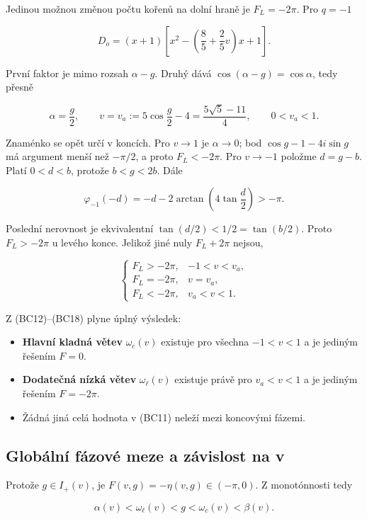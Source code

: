 \documentclass[11pt,a4paper]{article}
\theoremstyle{remark}\newtheorem{remark}[theorem]{Poznámka}
\numberwithin{equation}{section}
\providecommand{\tightlist}{\setlength{\itemsep}{0pt}\setlength{\parskip}{0pt}}
\begin{document}
Jedinou možnou změnou počtu kořenů na dolní hraně je \(F_L=-2\pi\). Pro
\(q=-1\)

\[
D_o=(x+1)\left[x^2-\left(\frac85+\frac25v\right)x+1\right].
\tag{BC16}
\]

První faktor je mimo rozsah \(\alpha-g\). Druhý dává
\(\cos(\alpha-g)=\cos\alpha\), tedy přesně

\[
\alpha=\frac g2,\qquad
v=v_a:=5\cos\frac g2-4=\frac{5\sqrt5-11}{4},
\qquad 0<v_a<1.
\tag{BC17}
\]

Znaménko se opět určí v koncích. Pro \(v\to1\) je \(\alpha\to0\); bod
\(\cos g-1-4i\sin g\) má argument menší než \(-\pi/2\), a proto
\(F_L<-2\pi\). Pro \(v\to-1\) položme \(d=g-b\). Platí \(0<d<b\),
protože \(b<g<2b\). Dále

\[
\varphi_{-1}(-d)
=-d-2\arctan\left(4\tan\frac d2\right)>-\pi.
\]

Poslední nerovnost je ekvivalentní \(\tan(d/2)<1/2=\tan(b/2)\). Proto
\(F_L>-2\pi\) u levého konce. Jelikož jiné nuly \(F_L+2\pi\) nejsou,

\[
\begin{cases}
F_L>-2\pi,& -1<v<v_a,\\
F_L=-2\pi,& v=v_a,\\
F_L<-2\pi,& v_a<v<1.
\end{cases}
\tag{BC18}
\]

Z (BC12)--(BC18) plyne úplný výsledek:

\begin{itemize}
\tightlist
\item
  \textbf{Hlavní kladná větev} \(\omega_c(v)\) existuje pro všechna
  \(-1<v<1\) a je jediným řešením \(F=0\).
\item
  \textbf{Dodatečná nízká větev} \(\omega_\ell(v)\) existuje právě pro
  \(v_a<v<1\) a je jediným řešením \(F=-2\pi\).
\item
  Žádná jiná celá hodnota v (BC11) neleží mezi koncovými fázemi.
\end{itemize}

\hypertarget{globuxe1lnuxed-fuxe1zovuxe9-meze-a-zuxe1vislost-na-v}{%
\subsection{Globální fázové meze a závislost na
v}\label{globuxe1lnuxed-fuxe1zovuxe9-meze-a-zuxe1vislost-na-v}}

Protože \(g\in I_+(v)\), je \(F(v,g)=-\eta(v,g)\in(-\pi,0)\). Z
monotónnosti tedy

\[
\alpha(v)<\omega_\ell(v)<g<\omega_c(v)<\beta(v).
\tag{BC19}
\]
\end{document}

